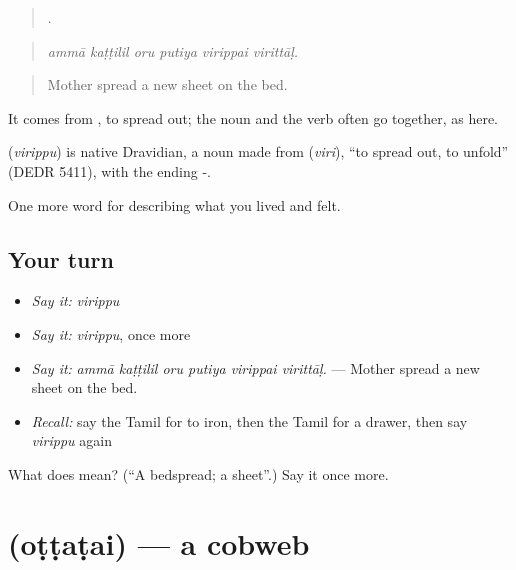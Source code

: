 \begin{quote}
     .
\end{quote}

\begin{quote}
\emph{ammā kaṭṭilil oru putiya virippai virittāḷ.}
\end{quote}

\begin{quote}
Mother spread a new sheet on the bed.
\end{quote}

It comes from , to spread out; the noun and the verb often go together, as here.

\begin{cousinweb}
\textbf{} (\emph{virippu}) is native Dravidian, a noun made from  (\emph{viri}), \textquotedblleft{}to spread out, to unfold\textquotedblright{} (DEDR 5411), with the ending -.
\end{cousinweb}

\begin{grammarlens}[title={What you've built}]
One more word for describing what you lived and felt.
\end{grammarlens}

\subsection*{Your turn}
\begin{itemize}
\raggedright
  \item \emph{Say it:} \emph{virippu}
  \item \emph{Say it:} \emph{virippu}, once more
  \item \emph{Say it:} \emph{ammā kaṭṭilil oru putiya virippai virittāḷ.} — Mother spread a new sheet on the bed.
  \item \emph{Recall:} say the Tamil for to iron, then the Tamil for a drawer, then say \emph{virippu} again
\end{itemize}

\begin{tcolorbox}[breakable,colback=teal!4,colframe=teal!35!black,title={Before you move on}]
What does  mean? (\textquotedblleft{}A bedspread; a sheet\textquotedblright{}.) Say it once more.
\end{tcolorbox}
\section[\texorpdfstring{\ta{ஒட்டடை} (oṭṭaṭai)}{ஒட்டடை (oṭṭaṭai)}]{ (oṭṭaṭai) — a cobweb}

